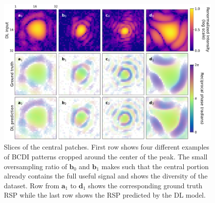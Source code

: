 \begin{figure}[H]
    \centering
    \includegraphics[width=\textwidth]{figures/Phasing/central_patch_lowstrain_RSP.pdf}
    \caption{Slices of the central patches. First row shows four different examples of BCDI patterns cropped around the 
    center of the peak. The small oversampling ratio of $\mathbf{b}_0$ and $\mathbf{b}_1$ makes such that the central portion 
    already contains the full useful signal and shows the diversity of the dataset. Row from $\mathbf{a}_1$ to $\mathbf{d}_1$
    shows the corresponding ground truth RSP while the last row shows the RSP predicted by the DL model.  }
    
    \label{fig:centralpatch_RSP_lowstrain}

\end{figure}

